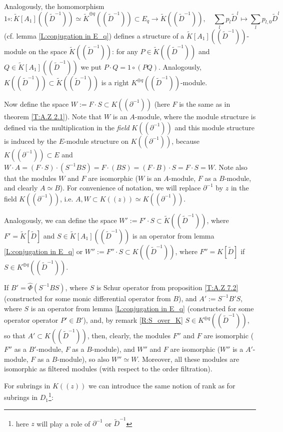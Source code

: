 \documentclass[11pt]{article}
\theoremstyle{definition}
\theoremstyle{plain}
\numberwithin{equation}{section}
\begin{document}
Analogously, the homomorphism 
$$
1\circ :\tilde{K}[A_1]((\tilde{D}^{-1}))\simeq \tilde{K}^{\oplus q}((\tilde{D}^{-1})) \subset E_q\rightarrow  \tilde{K}((\tilde{D}^{-1})), \quad \sum_l p_l\tilde{D}^l \mapsto  \sum_l p_{l,0}\tilde{D}^l
$$
(cf. lemma \ref{L:conjugation in E_q}) defines a structure of a $\tilde{K}[A_1]((\tilde{D}^{-1}))$-module on the space  $\tilde{K}((\tilde{D}^{-1}))$: for any $P\in \tilde{K}((\tilde{D}^{-1}))$ and $Q\in \tilde{K}[A_1]((\tilde{D}^{-1}))$ we put $P\cdot Q= 1\circ (PQ)$. Analogously, $K((\tilde{D}^{-1}))\subset \tilde{K}((\tilde{D}^{-1}))$ is a right $K^{\oplus q}((\tilde{D}^{-1}))$-module. 

Now define the space $W:= F\cdot S \subset K((\partial^{-1}))$ (here $F$ is the same as in theorem \ref{T:A.Z 2.1}). Note that $W$ is an $A$-module, where the module structure is defined via the multiplication in the {\it field} $K((\partial^{-1}))$ and this module structure is induced by the $E$-module structure on $K((\partial^{-1}))$, because $K((\partial^{-1}))\subset E$ and $W\cdot A=(F\cdot S)\cdot (S^{-1}BS)=F\cdot (BS)=(F\cdot B)\cdot S= F\cdot S= W$. 
Note also that the modules $W$ and $F$ are isomorphic ($W$ is an $A$-module, $F$ as a $B$-module, and clearly $A\simeq B$). For convenience of notation, we will replace $\partial^{-1}$ by $z$ in the field $K((\partial^{-1}))$, i.e. $A,W\subset K((z))\simeq K((\partial^{-1}))$. 

Analogously, we can define the space $W':=F'\cdot S\subset \tilde{K}((\tilde{D}^{-1}))$, where $F'=\tilde{K}[\tilde{D}]$ and $S\in \tilde{K}[A_1]((\tilde{D}^{-1}))$ is an operator from lemma 
\ref{L:conjugation in E_q} or $W'':=F''\cdot S\subset K((\tilde{D}^{-1}))$, where $F''=K[\tilde{D}]$ if $S\in K^{\oplus q}((\tilde{D}^{-1}))$. 

If $B'=\hat{\Phi}(S^{-1}BS)$, where $S$ is Schur operator from proposition \ref{T:A.Z 7.2} (constructed for some monic differential operator from $B$), and $A':=S^{-1}B'S$, where $S$ is an operator from lemma \ref{L:conjugation in E_q} (constructed for some operator operator $P'\in B'$), and, by remark \ref{R:S_over_K} $S\in K^{\oplus q}((\tilde{D}^{-1}))$, so that $A'\subset K((\tilde{D}^{-1}))$, 
then, clearly, the modules $F''$ and $F$ are isomorphic ($F''$ as a $B'$-module, $F$ as a $B$-module), and  
$W''$ and $F$ are isomorphic ($W''$ is a $A'$-module, $F$ as a $B$-module), so also $W''\simeq W$. Moreover, all these modules are isomorphic as filtered modules (with respect to the order filtration). 

For subrings in $K((z))$ we can introduce the same notion of rank as for subrings in $D_1$\footnote{here $z$ will play a role of $\partial^{-1}$ or $\tilde{D}^{-1}$}:
\end{document}
